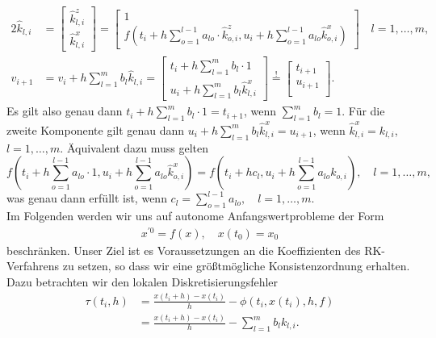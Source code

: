 \begin{alignat*}{2}
    \hat{k}_{l,i} &= \begin{bmatrix} \hat{k}^{z}_{l,i} \\ \hat{k}^{x}_{l,i} \end{bmatrix}
    = \begin{bmatrix} 1 \\
    f\left( t_i + h \sum\limits_{o=1}^{l-1} a_{lo} \cdot \hat{k}^{z}_{o,i},
    u_i + h \sum\limits_{o=1}^{l-1} a_{lo} \hat{k}^{x}_{o,i} \right)
    \end{bmatrix}  \quad l=1,\dots,m, \\
    v_{i+1} &= v_i + h \sum\limits_{l=1}^{m} b_l \hat{k}_{l,i} = \begin{bmatrix}
                                                                     t_i + h \sum\limits_{l=1}^{m} b_l \cdot 1\\
                                                                     u_i + h \sum\limits_{l=1}^{m} b_l \hat{k}^{x}_{l,i}
    \end{bmatrix}
    \overset{!}{=}\begin{bmatrix}t_{i+1}\\u_{i+1}\\\end{bmatrix}.
\end{alignat*}
Es gilt also genau dann $t_i + h \sum\limits_{l=1}^{m} b_l \cdot 1 = t_{i+1}$, wenn $\sum\limits_{l=1}^{m} b_l = 1$.
Für die zweite Komponente gilt genau dann $u_i + h \sum\limits_{l=1}^{m} b_l \hat{k}^{x}_{l,i} = u_{i+1}$,
wenn $\hat{k}^{x}_{l,i} = k_{l,i}$, $l = 1, \dots, m$. Äquivalent dazu muss gelten
\[
    f\left( t_i + h \sum\limits_{o=1}^{l-1} a_{lo} \cdot 1,
    u_i + h \sum\limits_{o=1}^{l-1} a_{lo} \hat{k}^{x}_{o,i} \right)
    = f\left( t_i +hc_l, u_i + h \sum_{o=1}^{l-1} a_{lo} k_{o,i} \right), \quad l = 1, \dots, m,
\]
was genau dann erfüllt ist, wenn $c_l = \sum\limits_{o=1}^{l-1} a_{lo}, \quad l= 1, \dots, m.$ \qedwhite\\
Im Folgenden werden wir uns auf autonome Anfangswertprobleme der Form
\begin{align}
    x^{\prime0} = f(x), \quad x(t_0) = x_0   \label{eq:9}
\end{align}
beschränken. Unser Ziel ist es Voraussetzungen an die Koeffizienten des RK-Verfahrens zu setzen, so dass wir eine
größtmögliche Konsistenzordnung erhalten. Dazu betrachten wir den lokalen Diskretisierungsfehler
\begin{align}
    \tau (t_i,h) &= \frac{x(t_i + h) - x(t_i)}{h} - \phi(t_i, x(t_i), h, f) \nonumber \\
    &= \frac{x(t_i + h) - x(t_i)}{h} - \sum_{l=1}^{m} b_l k_{l,i}.  \label{eq:kon_auto}
\end{align}
